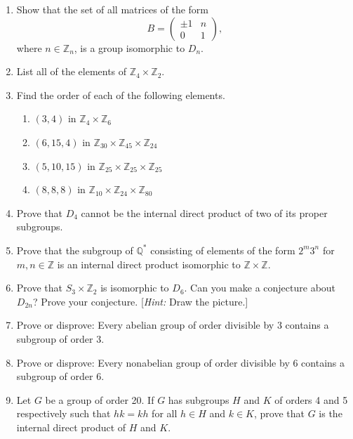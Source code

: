 {\begin{enumerate}
\item
Show that the set of all matrices of the form
$$
B =
\left(
\begin{array}{ccc}
\pm 1 & n \\
0 & 1
\end{array}
\right),
$$
where $n \in {\mathbb Z}_n$, is a group isomorphic to $D_n$.
 

\item
List all of the elements of ${\mathbb Z}_4 \times {\mathbb Z}_2$.
 

\item
Find the order of each of the following elements.
\begin{enumerate}
 
 \item
$(3, 4)$ in ${\mathbb Z}_4 \times {\mathbb Z}_6$

 \item
$(6, 15, 4)$ in ${\mathbb Z}_{30} \times {\mathbb Z}_{45} \times {\mathbb
Z}_{24}$

 \item
$(5, 10, 15)$ in ${\mathbb Z}_{25} \times {\mathbb Z}_{25} \times {\mathbb
Z}_{25}$

 \item
$(8, 8, 8)$ in ${\mathbb Z}_{10} \times {\mathbb Z}_{24} \times {\mathbb
Z}_{80}$
 
\end{enumerate}
 

\item
Prove that $D_4$ cannot be the internal direct product of two of its
proper subgroups. 
 

\item
Prove that the subgroup of ${\mathbb Q}^\ast$ consisting of elements of
the form $2^m 3^n$ for $m,n \in {\mathbb Z}$ is an internal direct
product isomorphic to ${\mathbb Z} \times {\mathbb Z}$.
 

\item
Prove that $S_3 \times {\mathbb Z}_2$ is isomorphic to $D_6$. Can you
make a conjecture about $D_{2n}$? Prove your conjecture. [{\em Hint:\/}
Draw the picture.] 
 

\item
Prove or disprove: Every abelian group of order divisible by 3
contains a subgroup of order 3.  


\item
Prove or disprove: Every nonabelian group of order divisible by 6
contains a subgroup of order 6. 
 

\item
Let $G$ be a group of order 20. If $G$ has subgroups $H$ and $K$ of
orders 4 and 5 respectively such that $hk = kh$ for all $h \in H$ and
$k \in K$, prove that $G$ is the internal direct product of $H$ and $K$. 
 


\end{enumerate}}
